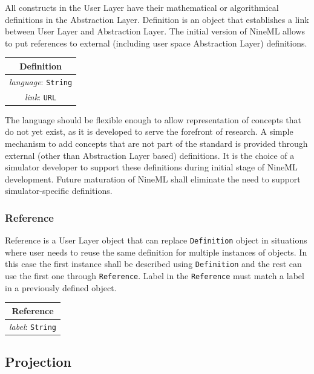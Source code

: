 \documentclass{article}
\begin{document}
All constructs in the User Layer have their mathematical or algorithmical
definitions in the Abstraction Layer. Definition is an object that
establishes a link between User Layer and Abstraction Layer. The initial
version of NineML allows to put references to external (including user
space Abstraction Layer) definitions.

\begin{table}[htb]
\center
\begin{tabular}{|c|}
\hline
\hline
Definition \\
\hline
\hline
{\em language}: {\tt String} \\
\hline
{\em link}: {\tt URL}\\
\hline
\end{tabular}
\end{table}

The language should be flexible enough to allow representation of concepts
that do not yet exist, as it is developed to serve the forefront of research.
A simple mechanism to add concepts that are not part of the standard is
provided through external (other than Abstraction Layer based) definitions.
It is the choice of a simulator developer to support these definitions during
initial stage of NineML development. Future
maturation of NineML shall eliminate the need to support simulator-specific
definitions.

\subsubsection{Reference}

Reference is a User Layer object that can replace {\tt Definition} object
in situations where user needs to reuse the same definition for multiple
instances of objects. In this case the first instance shall be described using
{\tt Definition} and the rest can use the first one through {\tt Reference}.
Label in the {\tt Reference} must match a label in a previously defined
object.

\begin{table}[htb]
\center
\begin{tabular}{|c|}
\hline
\hline
Reference \\
\hline
\hline
{\em label}: {\tt String} \\
\hline
\end{tabular}
\end{table}

\subsection{Projection}
\label{projections}
\end{document}
